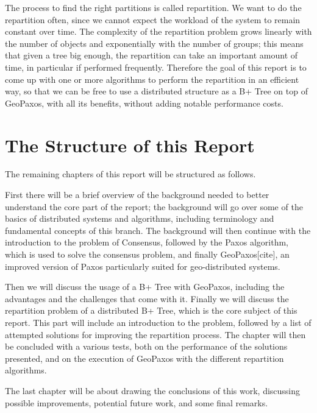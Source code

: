 The process to find the right partitions is called repartition. We want to do the repartition often, since we cannot expect the workload of the system to remain constant over time. The complexity of the repartition problem grows linearly with the number of objects and exponentially with the number of groups; this means that given a tree big enough, the repartition can take an important amount of time, in particular if performed frequently. Therefore the goal of this report is to come up with one or more algorithms to perform the repartition in an efficient way, so that we can be free to use a distributed structure as a B+ Tree on top of GeoPaxos, with all its benefits, without adding notable performance costs.

\section{The Structure of this Report}\label{the-structure-of-this-report}
The remaining chapters of this report will be structured as follows.

First there will be a brief overview of the background needed to better understand the core part of the report; the background will go over some of the basics of distributed systems and algorithms, including terminology and fundamental concepts of this branch. The background will then continue with the introduction to the problem of Consensus, followed by the Paxos algorithm, which is used to solve the consensus problem, and finally GeoPaxos[cite], an improved version of Paxos particularly suited for geo-distributed systems. 

Then we will discuss the usage of a B+ Tree with GeoPaxos, including the advantages and the challenges that come with it. Finally we will discuss the repartition problem of a distributed B+ Tree, which is the core subject of this report. This part will include an introduction to the problem, followed by a list of attempted solutions for improving the repartition process. The chapter will then be concluded with a various tests, both on the performance of the solutions presented, and on the execution of GeoPaxos with the different repartition algorithms.

The last chapter will be about drawing the conclusions of this work, discussing possible improvements, potential future work, and some final remarks.